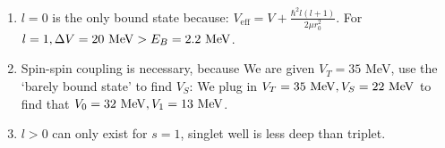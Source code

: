 \documentclass{school-22.101-notes}
\begin{document}
    \begin{enumerate}
    \item $l=0$ is the only bound state because: $V_{\mathrm{eff}} = V + \frac{\hbar^2 l(l+1)}{2 \mu r_0^2}$. 
    For $l=1, \Delta V = 20 \mbox{ } \mathrm{MeV} > E_B = 2.2 \mbox{ } \mathrm{MeV}$.
    \item Spin-spin coupling is necessary, because 
    We are given $V_T = 35$ MeV, use the `barely bound state' to find $V_S$: 
    We plug in $V_T = 35 \mbox{ } \mathrm{MeV}, V_S = 22 \mbox{ } \mathrm{MeV}$ to find that $V_0 = 32 \mbox{ } \mathrm{MeV}, V_1 = 13 \mbox{ } \mathrm{MeV}$. 
    \item $l>0$ can only exist for $s=1$, singlet well is less deep than triplet.     
    \end{enumerate}


\clearpage
\end{document}
